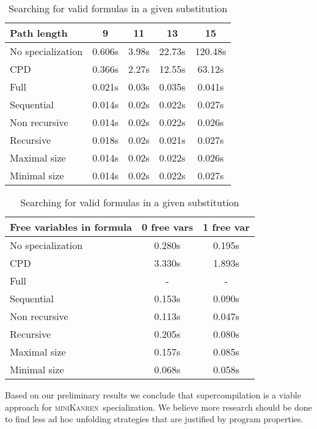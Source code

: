 \documentclass[submission,copyright,creativecommons]{eptcs}
\newcommand{\miniKanren}{\textsc{miniKanren}\ }
\begin{document}
\begin{table}[!h]
\small
\begin{minipage}[t]{.4\textwidth}
\begin{tabular}{|p{2.45cm}|c|c|c|c|}
\hline
Path length & 9 & 11 & 13 & 15 \\ \hline
\hline
No specialization      & 0.606s & 3.98s & 22.73s & 120.48s \\
CPD          & 0.366s & 2.27s & 12.55s & 63.12s \\ \hline
Full         & 0.021s & 0.03s & 0.035s & 0.041s \\
Sequential   & 0.014s & 0.02s & 0.022s & 0.027s \\
Non recursive& 0.014s & 0.02s & 0.022s & 0.026s \\
Recursive    & 0.018s & 0.02s & 0.021s & 0.027s \\
Maximal size & 0.014s & 0.02s & 0.022s & 0.026s \\
Minimal size & 0.014s & 0.02s & 0.022s & 0.027s \\
\hline
\end{tabular}
\caption{Searching for paths in $K_{10}$.}
\label{tab:paths}
\end{minipage}
\qquad
\qquad
\qquad
\begin{minipage}[t]{.4\textwidth}
\begin{tabular}{|p{2.7cm}|c|c|}
\hline
Free variables in formula& 0 free vars & 1 free var  \\ \hline
\hline
No specialization       & 0.280s & 0.195s  \\
CPD           & 3.330s & 1.893s  \\
\hline
Full               & -       &  - \\
Sequential         & 0.153s  & 0.090s \\
Non recursive      & 0.113s & 0.047s \\
Recursive          & 0.205s & 0.080s \\
Maximal size       & 0.157s & 0.085s \\
Minimal size       & 0.068s & 0.058s \\
\hline
\end{tabular}
\caption{Searching for valid formulas in a given substitution}
\label{tab:logic}
\end{minipage}
\end{table}

Based on our preliminary results we conclude that supercompilation is a viable approach for \miniKanren specialization.
We believe more research should be done to find less ad hoc unfolding strategies that are justified by program properties.




\end{document}
